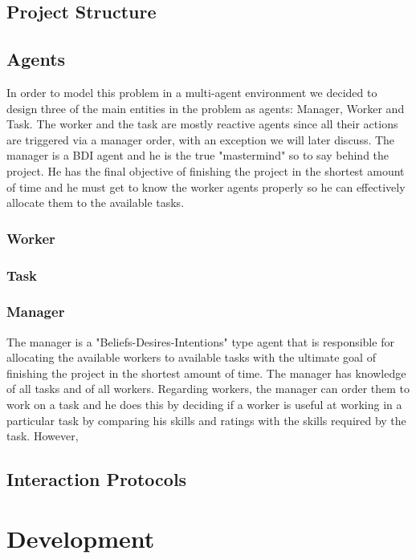 \documentclass[paper=a4, fontsize=11pt]{scrartcl} %
\numberwithin{equation}{section} %
\numberwithin{figure}{section} %
\numberwithin{table}{section} %
\begin{document}
\subsection{Project Structure}

\subsection{Agents}
In order to model this problem in a multi-agent environment we decided to design three of the main entities in the problem as agents: Manager, Worker and Task. The worker and the task are mostly reactive agents since all their actions are triggered via a manager order, with an exception we will later discuss. The manager is a BDI agent and he is the true "mastermind" so to say behind the project. He has the final objective of finishing the project in the shortest amount of time and he must get to know the worker agents properly so he can effectively allocate them to the available tasks.

\subsubsection{Worker}

\subsubsection{Task}

\subsubsection{Manager}
The manager is a "Beliefs-Desires-Intentions" type agent that is responsible for allocating the available workers to available tasks with the ultimate goal of finishing the project in the shortest amount of time. The manager has knowledge of all tasks and of all workers. Regarding workers, the manager can order them to work on a task and he does this by deciding if a worker is useful at working in a particular task by comparing his skills and ratings with the skills required by the task. However,
\subsection{Interaction Protocols}

\section{Development}
\end{document}
